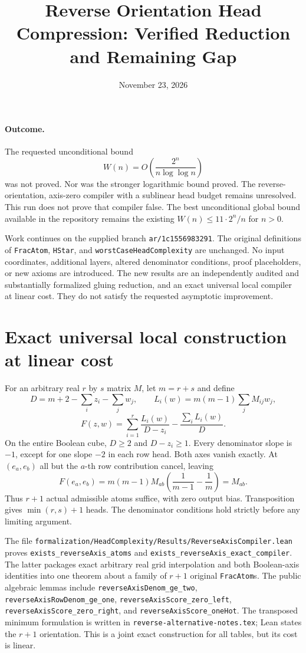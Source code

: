 \documentclass[11pt]{article}
\title{Reverse Orientation Head Compression: Verified Reduction and Remaining Gap}
\author{}
\date{November 23, 2026}
\begin{document}
\maketitle

\paragraph{Outcome.}
The requested unconditional bound
\[
 W(n)=O\left(\frac{2^n}{n\log\log n}\right)
\]
was not proved. Nor was the stronger logarithmic bound proved.
The reverse-orientation, axis-zero compiler with a sublinear head budget
remains unresolved. This run does not prove that compiler false.
The best unconditional global bound available in the repository remains
the existing $W(n)\leq 11\cdot 2^n/n$ for $n>0$.

Work continues on the supplied branch \texttt{ar/1c1556983291}.
The original definitions of \texttt{FracAtom}, \texttt{HStar}, and
\texttt{worstCaseHeadComplexity} are unchanged.
No input coordinates, additional layers, altered denominator conditions,
proof placeholders, or new axioms are introduced. The new results are
an independently audited and substantially formalized gluing reduction,
and an exact universal local compiler at linear cost. They do not satisfy
the requested asymptotic improvement.

\section{Exact universal local construction at linear cost}
For an arbitrary real $r$ by $s$ matrix $M$, let $m=r+s$ and define
\[
 D=m+2-\sum_i z_i-\sum_jw_j,\qquad
 L_i(w)=m(m-1)\sum_jM_{ij}w_j,
\]
\[
 F(z,w)=\sum_{i=1}^r\frac{L_i(w)}{D-z_i}
               -\frac{\sum_iL_i(w)}D.
\]
On the entire Boolean cube, $D\geq2$ and $D-z_i\geq1$.
Every denominator slope is $-1$, except for one slope $-2$ in each row
head. Both axes vanish exactly. At $(e_a,e_b)$ all but the $a$-th row
contribution cancel, leaving
\[
 F(e_a,e_b)=m(m-1)M_{ab}
       \left(\frac1{m-1}-\frac1m\right)=M_{ab}.
\]
Thus $r+1$ actual admissible atoms suffice, with zero output bias.
Transposition gives $\min(r,s)+1$ heads. The denominator conditions
hold strictly before any limiting argument.

The file \texttt{formalization/HeadComplexity/Results/ReverseAxisCompiler.lean}
proves \texttt{exists\_reverseAxis\_atoms} and
\texttt{exists\_reverseAxis\_exact\_compiler}. The latter packages exact
arbitrary real grid interpolation and both Boolean-axis identities into
one theorem about a family of $r+1$ original \texttt{FracAtom}s.
The public algebraic lemmas include
\texttt{reverseAxisDenom\_ge\_two},
\texttt{reverseAxisRowDenom\_ge\_one},
\texttt{reverseAxisScore\_zero\_left},
\texttt{reverseAxisScore\_zero\_right}, and
\texttt{reverseAxisScore\_oneHot}.
The transposed minimum formulation is written in
\texttt{reverse-alternative-notes.tex}; Lean states the $r+1$ orientation.
This is a joint exact construction for all tables, but its cost is linear.
\end{document}
